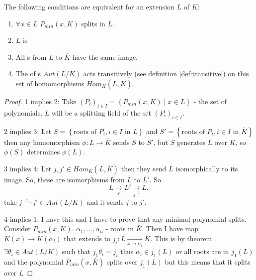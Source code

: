 \begin{theorem}
  The following conditions are equivalent for an extension $L$ of $K$:
  \begin{enumerate}
  \item $\forall x \in L$ $P_{min}\left(x, K\right)$ splits in $L$.
  \item $L$ is 
  \item All s from $L$ to $\bar{K}$ have the
    same image.
  \item The  of s
    $Aut\left(L/K\right)$ acts transitively (see definition
    \ref{def:transitive}) on this set of 
    homomorphisms $Hom_K\left(L, \bar{K}\right)$.
  \end{enumerate}
  \begin{proof}
    1 implies 2: Take
    $\left(P_i\right)_{i \in I} = \left\{P_{min}\left(x, K\right) \mid
    x \in L\right\}$ - the set of polynomials.
    $L$ will be a splitting field of the set $\left(P_i\right)_{i \in I}$.

    2 implies 3: Let
    $S = \left\{\mbox{roots of } P_i, i \in I \mbox{ in } L\right\}$
    and
    $S' = \left\{\mbox{roots of } P_i, i \in I \mbox{ in }
    \bar{K}\right\}$ then any homomorphism
    $\phi: L \to \bar{K}$ sends $S$ to $S'$, but $S$ generates $L$
    over $K$, so $\phi\left(S\right)$ determines $\phi\left(L\right)$.

    3 implies 4: Let $j, j' \in Hom_K\left(L, \bar{K}\right)$ then
    they send $L$ isomorphically to its image. So, these are
    isomorphisms from $L$ to $L'$. So
    \[
    L \xrightarrow[j']{} L' \xrightarrow[j^{-1}]{} L,
    \]
    take $j^{-1} \cdot j' \in Aut \left(L/K\right)$ and it sends $j$
    to $j'$.

    4 implies 1:  I have this  and I have to prove
    that any minimal polynomial splits. Consider
    $P_{min}\left(x, K\right)$. $\alpha_1, \dots, \alpha_n$ - roots in
    $\bar{K}$. Then I have map $K\left(x\right) \to
    K\left(\alpha_i\right)$ that extends to
    $j_i: L \xrightarrow[x \to \alpha_i]{} \bar{K}$. This is by
    theorem .
    $\exists \theta_i \in Aut\left(L/K\right)$ such that
    $j_1 \theta_i = j_i$ thus
    $\alpha_i \in j_1\left(L\right)$ or all roots are in
    $j_1\left(L\right)$ and the polynomial
    $P_{min}\left(x, \bar{K}\right)$ splits over $j_1\left(L\right)$
    but this means that it splits over $L$    
  \end{proof}
  \label{thm:lec5_3}
\end{theorem}

